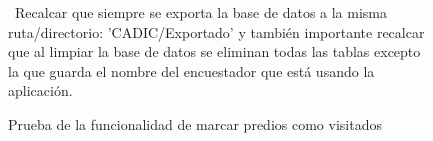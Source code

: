 \begin{figure}[h]
    \caption{Prueba de la funcionalidad de marcar predios como visitados}
    \label{fig:figura23}\
    Recalcar que siempre se exporta la base de datos a la misma ruta/directorio: 'CADIC/Exportado' y también importante recalcar que al limpiar la base de datos se eliminan todas las tablas
    excepto la que guarda el nombre del encuestador que está usando la aplicación.
\end{figure}

